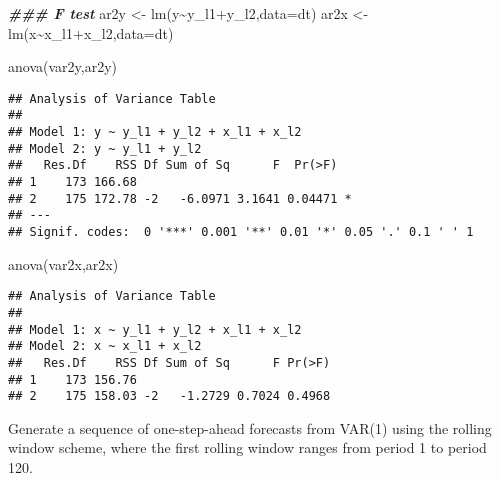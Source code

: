 \documentclass[
  oneside]{book}
\newenvironment{Shaded}{\begin{snugshade}}{\end{snugshade}}
\newcommand{\AttributeTok}[1]{\textcolor[rgb]{0.77,0.63,0.00}{#1}}
\newcommand{\DocumentationTok}[1]{\textcolor[rgb]{0.56,0.35,0.01}{\textbf{\textit{#1}}}}
\newcommand{\FunctionTok}[1]{\textcolor[rgb]{0.00,0.00,0.00}{#1}}
\newcommand{\NormalTok}[1]{#1}
\newcommand{\OtherTok}[1]{\textcolor[rgb]{0.56,0.35,0.01}{#1}}
\newcommand{\SpecialCharTok}[1]{\textcolor[rgb]{0.00,0.00,0.00}{#1}}
\begin{document}
\begin{Shaded}
\begin{Highlighting}[]
\DocumentationTok{\#\#\# F test}
\NormalTok{ar2y }\OtherTok{\textless{}{-}} \FunctionTok{lm}\NormalTok{(y}\SpecialCharTok{\textasciitilde{}}\NormalTok{y\_l1}\SpecialCharTok{+}\NormalTok{y\_l2,}\AttributeTok{data=}\NormalTok{dt)}
\NormalTok{ar2x }\OtherTok{\textless{}{-}} \FunctionTok{lm}\NormalTok{(x}\SpecialCharTok{\textasciitilde{}}\NormalTok{x\_l1}\SpecialCharTok{+}\NormalTok{x\_l2,}\AttributeTok{data=}\NormalTok{dt)}

\FunctionTok{anova}\NormalTok{(var2y,ar2y)}
\end{Highlighting}
\end{Shaded}

\begin{verbatim}
## Analysis of Variance Table
## 
## Model 1: y ~ y_l1 + y_l2 + x_l1 + x_l2
## Model 2: y ~ y_l1 + y_l2
##   Res.Df    RSS Df Sum of Sq      F  Pr(>F)  
## 1    173 166.68                              
## 2    175 172.78 -2   -6.0971 3.1641 0.04471 *
## ---
## Signif. codes:  0 '***' 0.001 '**' 0.01 '*' 0.05 '.' 0.1 ' ' 1
\end{verbatim}

\begin{Shaded}
\begin{Highlighting}[]
\FunctionTok{anova}\NormalTok{(var2x,ar2x)}
\end{Highlighting}
\end{Shaded}

\begin{verbatim}
## Analysis of Variance Table
## 
## Model 1: x ~ y_l1 + y_l2 + x_l1 + x_l2
## Model 2: x ~ x_l1 + x_l2
##   Res.Df    RSS Df Sum of Sq      F Pr(>F)
## 1    173 156.76                           
## 2    175 158.03 -2   -1.2729 0.7024 0.4968
\end{verbatim}

Generate a sequence of one-step-ahead forecasts from VAR(1) using the rolling window scheme, where the first rolling window ranges from period 1 to period 120.
\end{document}
